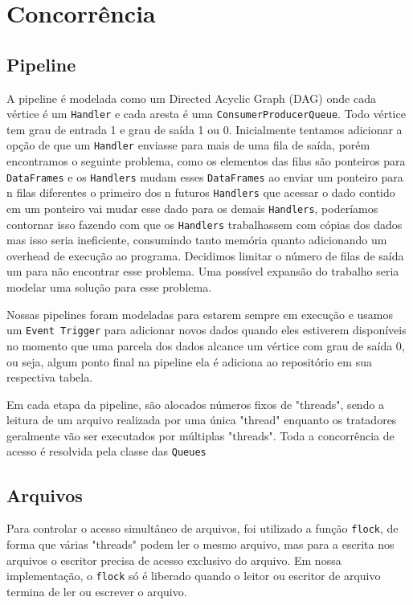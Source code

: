 \documentclass[12pt,a4paper]{article}
\begin{document}
\section*{Concorrência}
\subsection*{Pipeline}
A pipeline é modelada como um Directed Acyclic Graph (DAG) onde cada vértice é um \verb|Handler| e cada aresta é uma \verb|ConsumerProducerQueue|. Todo vértice tem grau de entrada 1 e grau de saída 1 ou 0. Inicialmente tentamos adicionar a opção de que um \verb|Handler| enviasse para mais de uma fila de saída, porém encontramos o seguinte problema, como os elementos das filas são ponteiros para \verb|DataFrames| e os \verb|Handlers| mudam esses \verb|DataFrames| ao enviar um ponteiro para n filas diferentes o primeiro dos n futuros \verb|Handlers| que acessar o dado contido em um ponteiro vai mudar esse dado para os demais \verb|Handlers|, poderíamos contornar isso fazendo com que os \verb|Handlers| trabalhassem com cópias dos dados mas isso seria ineficiente, consumindo tanto memória quanto adicionando um overhead de execução ao programa. Decidimos limitar o número de filas de saída um para não encontrar esse problema. Uma possível expansão do trabalho seria modelar uma solução para esse problema.

Nossas pipelines foram modeladas para estarem sempre em execução e usamos um \verb|Event Trigger| para adicionar novos dados quando eles estiverem disponíveis no momento que uma parcela dos dados alcance um vértice com grau de saída 0, ou seja, algum ponto final na pipeline ela é adiciona ao repositório em sua respectiva tabela.

Em cada etapa da pipeline, são alocados números fixos de "threads", sendo a leitura de um arquivo realizada por uma única "thread" enquanto os tratadores geralmente vão ser executados por múltiplas "threads".
Toda a concorrência de acesso é resolvida pela classe das \verb|Queues|

\subsection*{Arquivos}
Para controlar o acesso simultâneo de arquivos, foi utilizado a função \verb|flock|, de forma que várias "threads" podem ler o mesmo arquivo, mas para a escrita nos arquivos o escritor precisa de acesso exclusivo do arquivo. Em nossa implementação, o \verb|flock| só é liberado quando o leitor ou escritor de arquivo termina de ler ou escrever o arquivo.
\end{document}
